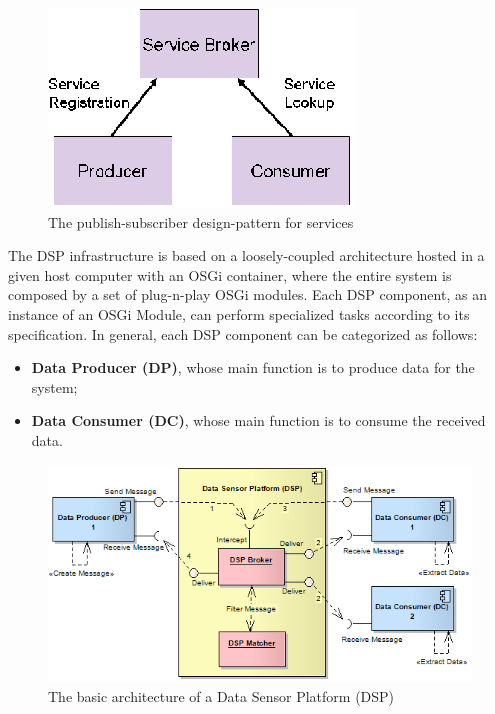 \begin{figure}[h]
  \centering
  \includegraphics[scale=0.6]{../diagrams/publish-subscriber-pattern}
  \caption{The publish-subscriber design-pattern for services}
  \label{fig:publish-subscriber-pattern}
\end{figure}

The DSP infrastructure is based on a loosely-coupled architecture hosted in a
given host computer with an OSGi container, where the entire system is
composed by a set of plug-n-play OSGi modules. Each DSP component, as an
instance of an OSGi Module, can perform specialized tasks according to its
specification. In general, each DSP component can be categorized as follows:

\begin{itemize}
  \item \textbf{Data Producer (DP)}, whose main function is to produce data for
  the system;
  \item \textbf{Data Consumer (DC)}, whose main function is to consume the
  received data.
\end{itemize}

\begin{figure}[!b]
  \centering
  \includegraphics[scale=0.7]{../diagrams/DSP-Producers-Consumers-Components-Interactions}
  \caption{The basic architecture of a Data Sensor Platform (DSP)}
  \label{fig:DSP-Producers-Consumers-Components-Interactions}
\end{figure}

